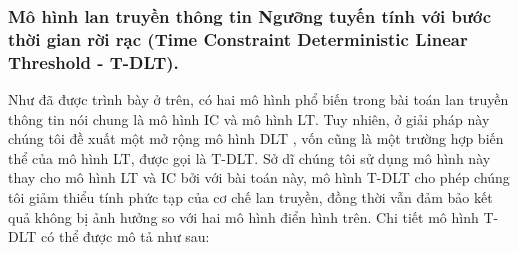 	\subsubsection{Mô hình lan truyền thông tin Ngưỡng tuyến tính với bước thời gian rời rạc (Time Constraint Deterministic Linear Threshold - T-DLT).}
 	Như đã được trình bày ở trên, có hai mô hình phổ biến trong bài toán lan truyền thông tin nói chung là mô hình IC và mô hình LT. Tuy nhiên, ở giải pháp này chúng tôi đề xuất một mở rộng mô hình DLT \cite{zaixin}, vốn cũng là một trường hợp biến thể của mô hình LT, được gọi là T-DLT. Sở dĩ chúng tôi sử dụng mô hình này thay cho mô hình LT và IC bởi với bài toán này, mô hình T-DLT cho phép chúng tôi giảm thiểu tính phức tạp của cơ chế lan truyền, đồng thời vẫn đảm bảo kết quả không bị ảnh hưởng so với hai mô hình điển hình trên. Chi tiết mô hình T-DLT có thể được mô tả như sau:
